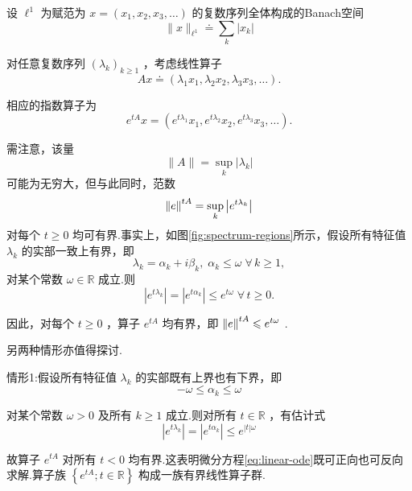 \begin{instance}\label{ins:diagonal-operator-l1}
设 ${\ell }^{1}$ 为赋范为 $x = \left( {{x}_{1},{x}_{2},{x}_{3},\ldots }\right)$ 的复数序列全体构成的Banach空间
\[
\| x{\| }_{{\ell }^{1}} \doteq  \mathop{\sum }\limits_{k}\left| {x}_{k}\right|
\]

对任意复数序列 ${\left( {\lambda }_{k}\right) }_{k \geq  1}$ ，考虑线性算子
\begin{equation}\tag{7.10}\label{eq:diagonal-operator-l1}
{Ax} \doteq  \left( {{\lambda }_{1}{x}_{1},{\lambda }_{2}{x}_{2},{\lambda }_{3}{x}_{3},\ldots }\right) .
\end{equation}

相应的指数算子为
\[
{e}^{tA}x = \left( {{e}^{t{\lambda }_{1}}{x}_{1},{e}^{t{\lambda }_{2}}{x}_{2},{e}^{t{\lambda }_{3}}{x}_{3},\ldots }\right) .
\]

需注意，该量
\[
\| A\|  = \mathop{\sup }\limits_{k}\left| {\lambda }_{k}\right|
\]
可能为无穷大，但与此同时，范数
\[
\norm{e}^{tA} = \mathop{\sup }\limits_{k}\left| {e}^{t{\lambda }_{k}}\right|
\]
对每个 $t \geq  0$ 均可有界.事实上，如图\ref{fig:spectrum-regions}所示，假设所有特征值 ${\lambda }_{k}$ 的实部一致上有界，即
\[
{\lambda }_{k} = {\alpha }_{k} + i{\beta }_{k},\;{\alpha }_{k} \leq  \omega \;\forall\,k \geq  1,
\]
对某个常数 $\omega  \in  \mathbb{R}$ 成立.则
\begin{equation}\tag{7.11}\label{eq:exp-bound-semigroup}
\left| {e}^{t{\lambda }_{k}}\right|  = \left| {e}^{t{\alpha }_{k}}\right|  \leq  {e}^{t\omega }\;\forall\,t \geq  0.
\end{equation}

因此，对每个 $t \geq  0$ ，算子 ${e}^{tA}$ 均有界，即 $\norm{e}^{tA} \leqslant  {e}^{t\omega }$ .

另两种情形亦值得探讨.

情形1:假设所有特征值 ${\lambda }_{k}$ 的实部既有上界也有下界，即
\[
- \omega  \leq  {\alpha }_{k} \leq  \omega
\]

对某个常数 $\omega  > 0$ 及所有 $k \geq  1$ 成立.则对所有 $t \in  \mathbb{R}$ ，有估计式
\begin{equation}\tag{7.12}\label{eq:exp-bound-group}
\left| {e}^{t{\lambda }_{k}}\right|  = \left| {e}^{t{\alpha }_{k}}\right|  \leq  {e}^{\left| t\right| \omega }
\end{equation}

故算子 ${e}^{tA}$ 对所有 $t < 0$ 均有界.这表明微分方程\eqref{eq:linear-ode}既可正向也可反向求解.算子族 $\left\{  {{e}^{tA};t \in  \mathbb{R}}\right\}$ 构成一族有界线性算子群.


\end{instance}
